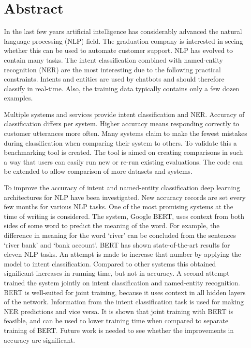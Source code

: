 \chapter*{Abstract}
\label{ch:abstract}

In the last few years artificial intelligence has considerably advanced the natural language processing (NLP) field.
The graduation company is interested in seeing whether this can be used to automate customer support.
NLP has evolved to contain many tasks.
The intent classification combined with named-entity recognition (NER) are the most interesting due to the following practical constraints.
Intents and entities are used by chatbots and should therefore classify in real-time.
Also, the training data typically contains only a few dozen examples.

Multiple systems and services provide intent classification and NER.
Accuracy of classification differs per system.
Higher accuracy means responding correctly to customer utterances more often.
Many systems claim to make the fewest mistakes during classification when comparing their system to others.
To validate this a benchmarking tool is created.
The tool is aimed on creating comparisons in such a way that users can easily run new or re-run existing evaluations.
The code can be extended to allow comparison of more datasets and systems.

To improve the accuracy of intent and named-entity classification deep learning architectures for NLP have been investigated.
New accuracy records are set every few months for various NLP tasks.
One of the most promising systems at the time of writing is considered.
The system, Google BERT, uses context from both sides of some word to predict the meaning of the word.
For example, the difference in meaning for the word `river' can be concluded from the sentences `river bank' and `bank account'.
BERT has shown state-of-the-art results for eleven NLP tasks.
An attempt is made to increase that number by applying the model to intent classification.
Compared to other systems this obtained significant increases in running time, but not in accuracy.
A second attempt trained the system jointly on intent classification and named-entity recognition.
BERT is well-suited for joint training, because it uses context in all hidden layers of the network.
Information from the intent classification task is used for making NER predictions and vice versa.
It is shown that joint training with BERT is feasible, and can be used to lower training time when compared to separate training of BERT.
Future work is needed to see whether the improvements in accuracy are significant.
